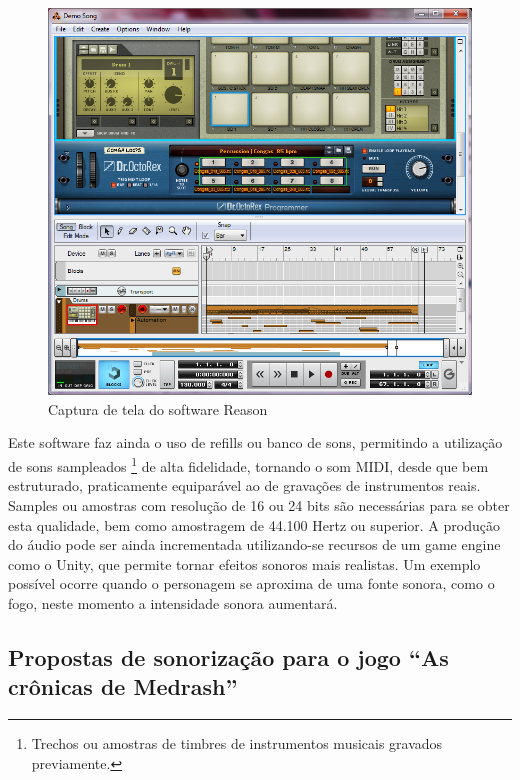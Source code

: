 \begin{figure}[!ht]
 \centering
 \includegraphics[scale=0.6]{musica_reason.png}
 \caption{Captura de tela do software Reason}
 \label{img:reason}
\end{figure}

Este software faz ainda o uso de refills ou banco de sons, permitindo 
a utilização de sons sampleados
\footnote{Trechos ou amostras de timbres de instrumentos musicais 
gravados previamente.}
 de alta fidelidade, tornando o som MIDI, desde que bem estruturado,
 praticamente equiparável ao de gravações de instrumentos reais. Samples 
ou amostras com resolução de 16 ou 24 bits são necessárias para se obter
 esta qualidade, bem como amostragem de 44.100 Hertz ou superior. 
A produção do áudio pode ser ainda incrementada utilizando-se recursos
de um game engine como o Unity, que permite tornar efeitos sonoros mais
 realistas. Um exemplo possível ocorre quando o personagem se aproxima 
de uma fonte sonora, como o fogo, neste momento a intensidade sonora
 aumentará.

\subsection{Propostas de sonorização para o jogo ``As crônicas 
de Medrash''}

